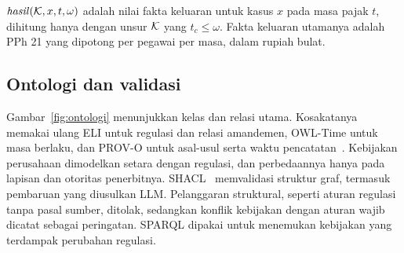 \begin{definisi}
\label{def:hasil}
$\mathit{hasil}(\mathcal{K}, x, t, \omega)$ adalah nilai fakta keluaran untuk kasus $x$ pada masa pajak $t$, dihitung hanya dengan unsur $\mathcal{K}$ yang $t_c \le \omega$. Fakta keluaran utamanya adalah PPh 21 yang dipotong per pegawai per masa, dalam rupiah bulat.
\end{definisi}

\subsection{Ontologi dan validasi}
Gambar~\ref{fig:ontologi} menunjukkan kelas dan relasi utama. Kosakatanya memakai ulang ELI untuk regulasi dan relasi amandemen, OWL-Time untuk masa berlaku, dan PROV-O untuk asal-usul serta waktu pencatatan~\cite{publicationsoffice2026eli,cox2017owltime,lebo2013provo}. Kebijakan perusahaan dimodelkan setara dengan regulasi, dan perbedaannya hanya pada lapisan dan otoritas penerbitnya.  SHACL~\cite{knublauch2017shacl} memvalidasi struktur graf, termasuk pembaruan yang diusulkan LLM. Pelanggaran struktural, seperti aturan regulasi tanpa pasal sumber, ditolak, sedangkan konflik kebijakan dengan aturan wajib dicatat sebagai peringatan.  SPARQL dipakai untuk menemukan kebijakan yang terdampak perubahan regulasi.

